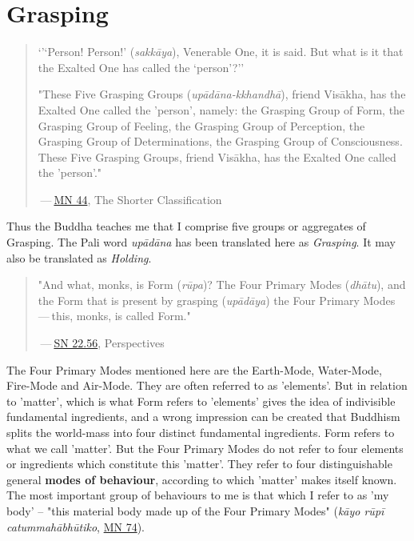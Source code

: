 \chapter{Grasping}

\begin{quotation}
`’`Person! Person!’ (\emph{sakkāya}), Venerable One, it is said. But what is
it that the Exalted One has called the `person'?''


"These Five Grasping Groups (\emph{upādāna-kkhandhā}), friend Visākha, has
the Exalted One called the 'person', namely: the Grasping Group of Form,
the Grasping Group of Feeling, the Grasping Group of Perception, the
Grasping Group of Determinations, the Grasping Group of Consciousness.
These Five Grasping Groups, friend Visākha, has the Exalted One called
the 'person'."


 — \href{https://suttacentral.net/mn44/en/sujato}{MN 44}, The Shorter Classification


\end{quotation}

Thus the Buddha teaches me that I comprise five groups or aggregates of
Grasping. The Pali word \emph{upādāna} has been translated here as
\emph{Grasping}. It may also be translated as \emph{Holding}.


\begin{quotation}
"And what, monks, is Form (\emph{rūpa})? The Four Primary Modes
(\emph{dhātu}), and the Form that is present by grasping (\emph{upādāya}) the
Four Primary Modes — this, monks, is called Form."


 — \href{https://suttacentral.net/sn22.56/en/bodhi}{SN 22.56}, Perspectives


\end{quotation}

The Four Primary Modes mentioned here are the Earth-Mode, Water-Mode,
Fire-Mode and Air-Mode. They are often referred to as 'elements'. But in
relation to 'matter', which is what Form refers to 'elements' gives the
idea of indivisible fundamental ingredients, and a wrong impression can
be created that Buddhism splits the world-mass into four distinct
fundamental ingredients. Form refers to what we call 'matter'. But the
Four Primary Modes do not refer to four elements or ingredients which
constitute this 'matter'. They refer to four distinguishable general
\textbf{modes of behaviour}, according to which 'matter' makes itself known.
The most important group of behaviours to me is that which I refer to as
'my body' – "this material body made up of the Four Primary Modes"
(\emph{kāyo rūpī catummahābhūtiko}, \href{https://suttacentral.net/mn74/en/sujato}{MN 74}).


